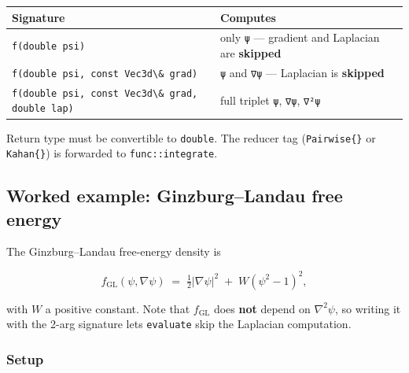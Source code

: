 {\def\LTcaptype{none} %
\begin{longtable}[]{@{}
  >{\raggedright\arraybackslash}p{}
  >{\raggedright\arraybackslash}p{}@{}}
\toprule\noalign{}
\begin{minipage}[b]{\linewidth}\raggedright
Signature
\end{minipage} & \begin{minipage}[b]{\linewidth}\raggedright
Computes
\end{minipage} \\
\midrule\noalign{}
\endhead
\bottomrule\noalign{}
\endlastfoot
\passthrough{\lstinline!f(double psi)!} & only
\passthrough{\lstinline!ψ!} --- gradient and Laplacian are
\textbf{skipped} \\
\passthrough{\lstinline!f(double psi, const Vec3d\& grad)!} &
\passthrough{\lstinline!ψ!} and \passthrough{\lstinline!∇ψ!} ---
Laplacian is \textbf{skipped} \\
\passthrough{\lstinline!f(double psi, const Vec3d\& grad, double lap)!}
& full triplet \passthrough{\lstinline!ψ!},
\passthrough{\lstinline!∇ψ!}, \passthrough{\lstinline!∇²ψ!} \\
\end{longtable}
}

Return type must be convertible to \passthrough{\lstinline!double!}. The
reducer tag (\passthrough{\lstinline!Pairwise\{\}!} or
\passthrough{\lstinline!Kahan\{\}!}) is forwarded to
\passthrough{\lstinline!func::integrate!}.

\subsection{Worked example: Ginzburg--Landau free
energy}\label{worked-example-ginzburglandau-free-energy}

The Ginzburg--Landau free-energy density is

\[
f_{\mathrm{GL}}(\psi, \nabla\psi) \;=\; \tfrac{1}{2} |\nabla\psi|^2 \;+\; W (\psi^2 - 1)^2,
\]

with \(W\) a positive constant. Note that \(f_{\mathrm{GL}}\) does
\textbf{not} depend on \(\nabla^2\psi\), so writing it with the 2-arg
signature lets \passthrough{\lstinline!evaluate!} skip the Laplacian
computation.

\subsubsection{Setup}\label{setup}

